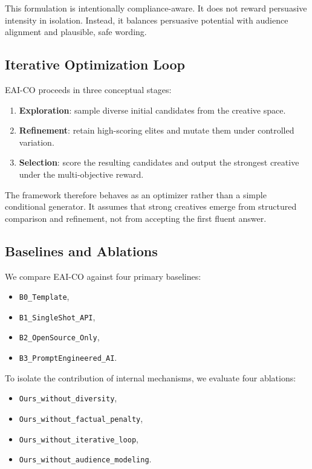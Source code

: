 \documentclass[preprint,12pt]{elsarticle}
\begin{document}
This formulation is intentionally compliance-aware. It does not reward persuasive intensity in isolation. Instead, it balances persuasive potential with audience alignment and plausible, safe wording.

\subsection{Iterative Optimization Loop}

EAI-CO proceeds in three conceptual stages:
\begin{enumerate}[leftmargin=1.5em]
    \item \textbf{Exploration}: sample diverse initial candidates from the creative space.
    \item \textbf{Refinement}: retain high-scoring elites and mutate them under controlled variation.
    \item \textbf{Selection}: score the resulting candidates and output the strongest creative under the multi-objective reward.
\end{enumerate}

The framework therefore behaves as an optimizer rather than a simple conditional generator. It assumes that strong creatives emerge from structured comparison and refinement, not from accepting the first fluent answer.

\subsection{Baselines and Ablations}

We compare EAI-CO against four primary baselines:
\begin{itemize}[leftmargin=1.5em]
    \item \texttt{B0\_Template},
    \item \texttt{B1\_SingleShot\_API},
    \item \texttt{B2\_OpenSource\_Only},
    \item \texttt{B3\_PromptEngineered\_AI}.
\end{itemize}

To isolate the contribution of internal mechanisms, we evaluate four ablations:
\begin{itemize}[leftmargin=1.5em]
    \item \texttt{Ours\_without\_diversity},
    \item \texttt{Ours\_without\_factual\_penalty},
    \item \texttt{Ours\_without\_iterative\_loop},
    \item \texttt{Ours\_without\_audience\_modeling}.
\end{itemize}
\end{document}
